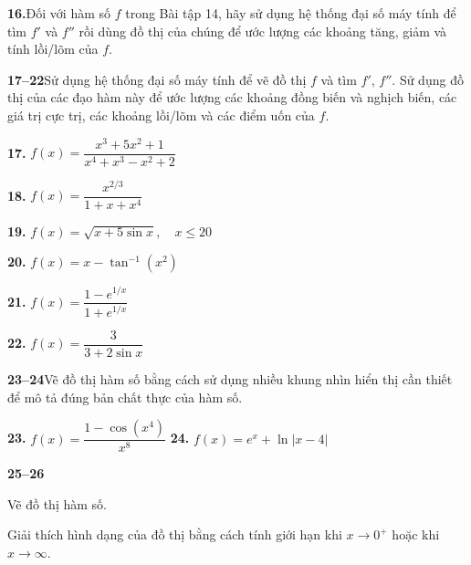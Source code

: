 \documentclass[10pt,a4paper]{article}
\newcommand{\casicon}{%
  \tikz[baseline=-0.6ex]{%
    \node[draw=stewartblue, rounded corners=0.5pt, line width=0.6pt, inner sep=0.8pt, text=stewartblue, font=\sffamily\bfseries\fontsize{6.5pt}{7pt}\selectfont, minimum size=8.5pt] {T};%
  }%
}
\newcommand{\exercisedivider}{\par\vspace{4pt}{\color{stewartblue!60}\hrule height 0.45pt}\vspace{4pt}}
\begin{document}
\begin{minipage}[t]{0.485\textwidth}
  \noindent\makebox[0pt][r]{\casicon\hspace{3pt}}\textbf{16.}\quad Đối với hàm số $f$ trong Bài tập 14, hãy sử dụng hệ thống đại số máy tính để tìm $f'$ và $f''$ rồi dùng đồ thị của chúng để ước lượng các khoảng tăng, giảm và tính lồi/lõm của $f$.
  \vspace{3pt}

  \noindent\makebox[0pt][r]{\casicon\hspace{3pt}}\textbf{\color{stewartblue}17--22}\quad Sử dụng hệ thống đại số máy tính để vẽ đồ thị $f$ và tìm $f'$, $f''$. Sử dụng đồ thị của các đạo hàm này để ước lượng các khoảng đồng biến và nghịch biến, các giá trị cực trị, các khoảng lồi/lõm và các điểm uốn của $f$.
  \vspace{3pt}

  \noindent\textbf{17.}\;\; $f(x) = \dfrac{x^3 + 5x^2 + 1}{x^4 + x^3 - x^2 + 2}$
  \vspace{2.5pt}

  \noindent\textbf{18.}\;\; $f(x) = \dfrac{x^{2/3}}{1 + x + x^4}$
  \vspace{2.5pt}

  \noindent\textbf{19.}\;\; $f(x) = \sqrt{x + 5 \sin x}, \quad x \le 20$
  \vspace{2.5pt}

  \noindent\textbf{20.}\;\; $f(x) = x - \tan^{-1}(x^2)$
  \vspace{2.5pt}

  \noindent\textbf{21.}\;\; $f(x) = \dfrac{1 - e^{1/x}}{1 + e^{1/x}}$
  \vspace{2.5pt}

  \noindent\textbf{22.}\;\; $f(x) = \dfrac{3}{3 + 2 \sin x}$

  \exercisedivider

  \noindent\textbf{\color{stewartblue}23--24}\quad Vẽ đồ thị hàm số bằng cách sử dụng nhiều khung nhìn hiển thị cần thiết để mô tả đúng bản chất thực của hàm số.
  \vspace{3pt}

  \noindent\textbf{23.}\;\; $f(x) = \dfrac{1 - \cos(x^4)}{x^8}$ \hfill \textbf{24.}\;\; $f(x) = e^x + \ln|x - 4|$

  \exercisedivider

  \noindent\textbf{\color{stewartblue}25--26}
  \begin{exsubparts}
    \item Vẽ đồ thị hàm số.
    \item Giải thích hình dạng của đồ thị bằng cách tính giới hạn khi $x \to 0^+$ hoặc khi $x \to \infty$.
  \end{exsubparts}
\end{minipage}\hfill
\end{document}
